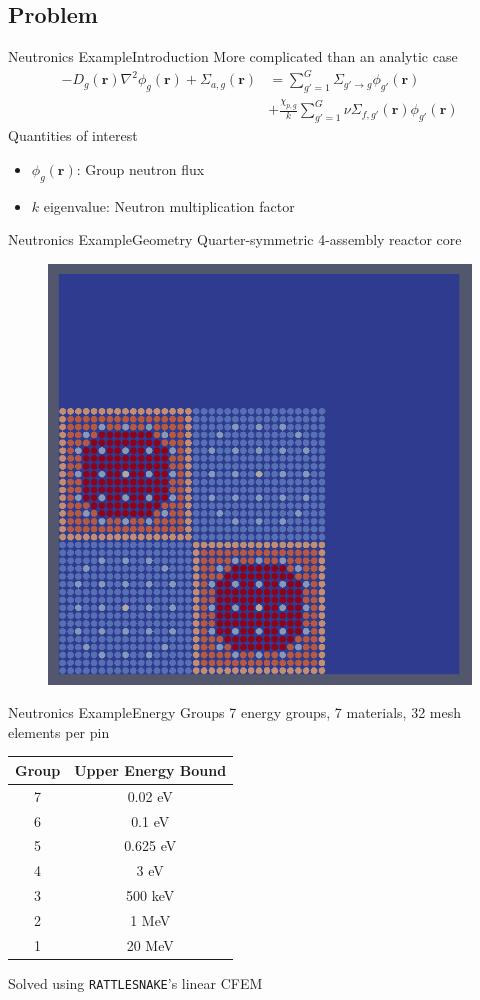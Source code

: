 \documentclass{beamer}
\begin{document}
\subsection{Problem}
\begin{frame}{Neutronics Example}{Introduction}\vspace{-20pt}
  More complicated than an analytic case
\begin{align*}
  -D_g(\mathbf{r})\nabla^2\phi_g(\mathbf{r}) + \Sigma_{a,g}(\mathbf{r}) &=
           \sum_{g'=1}^G \Sigma_{g'\to g}\phi_{g'}(\mathbf{r})\\
  & +\frac{\chi_{p,g}}{k}\sum_{g'=1}^G \nu\Sigma_{f,g'}(\mathbf{r})\phi_{g'}(\mathbf{r})
\end{align*}
  Quantities of interest
  \begin{itemize}
    \item $\phi_g(\mathbf{r})$: Group neutron flux
    \item $k$ eigenvalue: Neutron multiplication factor
  \end{itemize}
\end{frame}

\begin{frame}{Neutronics Example}{Geometry}%
  \vfill
  Quarter-symmetric 4-assembly reactor core
  \vfill
  \begin{figure}
    \centering
    \includegraphics[width=0.5\linewidth]{c5g7/geom}
  \end{figure}
  \vfill
\end{frame}

\begin{frame}{Neutronics Example}{Energy Groups}%
7 energy groups, 7 materials, 32 mesh elements per pin
  \begin{table}
    \centering{}
    \begin{tabular}{c c}
      Group & Upper Energy Bound \\ \hline
      7 & 0.02 eV\\
      6 & 0.1 eV\\
      5 & 0.625 eV\\
      4 & 3 eV\\
      3 & 500 keV \\
      2 & 1 MeV \\
      1 & 20 MeV
    \end{tabular}
  \end{table}
Solved using \texttt{RATTLESNAKE}'s linear CFEM
\end{frame}
\end{document}
